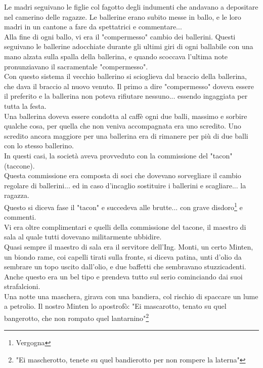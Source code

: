 \documentclass[10pt]{memoir} %
\begin{document}
Le madri seguivano le figlie col fagotto degli indumenti che andavano a depositare nel camerino delle ragazze. Le ballerine erano subito messe in ballo, e le loro madri in un cantone a fare da spettatrici e commentare...\\
Alla fine di ogni ballo, vi era il "compermesso" cambio dei ballerini. Questi seguivano le ballerine adocchiate durante gli ultimi giri di ogni ballabile con una mano alzata sulla spalla della ballerina, e quando scoccava l'ultima note pronunziavano il sacramentale "compermesso".\\
Con questo sistema il vecchio ballerino si scioglieva dal braccio della ballerina, che dava il braccio al nuovo venuto. Il primo a dire "compermesso" doveva essere il preferito e la ballerina non poteva rifiutare nessuno... essendo ingaggiata per tutta la festa.\\
Una ballerina doveva essere condotta al caffè ogni due balli, massimo e sorbire qualche cosa, per quella che non veniva accompagnata era uno scredito. Uno scredito ancora maggiore per una ballerina era di rimanere per più di due balli con lo stesso ballerino.\\
In questi casi, la società aveva provveduto con la commissione del "tacon" (taccone).\\
Questa commissione era composta di soci che dovevano sorvegliare il cambio regolare di ballerini... ed in caso d'incaglio sostituire i ballerini e scagliare... la ragazza.\\
Questo si diceva fase il "tacon" e succedeva alle brutte... con grave disdoro\footnote{Vergogna} e commenti.\\
Vi era oltre complimentari e quelli della commissione del tacone, il maestro di sala al quale tutti dovevano militarmente ubbidire. \\
Quasi sempre il maestro di sala era il servitore dell'Ing. Monti, un certo Minten, un biondo rame, coi capelli tirati sulla fronte, si diceva patina, unti d'olio da sembrare un topo uscito dall'olio, e due baffetti che sembravano stuzzicadenti. \\
Anche questo era un bel tipo e prendeva tutto sul serio cominciando dai suoi strafalcioni.\\
Una notte una maschera, girava con una bandiera, col rischio di spaccare un lume a petrolio. Il nostro Minten lo apostrofò: "Ei mascarotto, tenato su quel bangerotto, che non rompato quel lantarnino"\footnote{"Ei mascherotto, tenete su quel bandierotto per non rompere la laterna"}\\
\end{document}
